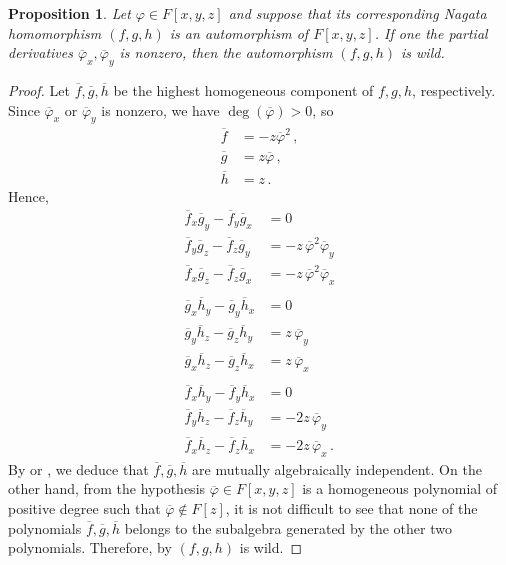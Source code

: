 \documentclass{amsart}
\newtheorem{prop}{Proposition}
\begin{document}
\begin{prop}\label{autwild}
	Let $\varphi\in F[x,y,z]$ and suppose that its corresponding Nagata homomorphism $(f,g,h)$ is an automorphism of $F[x,y,z]$. If one the partial derivatives  $\overline{\varphi}_x, \overline{\varphi}_y$ is nonzero, then the automorphism $(f,g,h)$ is wild.   
\end{prop}
\begin{proof}
	Let $\overline{f}, \overline{g}, \overline{h}$ be the highest homogeneous component of $f,g,h$, respectively.  Since $\overline{\varphi}_x$ or $ \overline{\varphi}_y$ is nonzero, we have $\deg(\overline{\varphi})>0$, so
	\begin{equation*}
		\begin{split}
			\overline{f}&=-z\overline{\varphi}^2\,,\\
			\overline{g}&=z\overline{\varphi}\,,\\
			\overline{h}&=z\,.     
		\end{split}
	\end{equation*}
	Hence,
	\begin{align*}
		\overline{f}_x\overline{g}_y-  \overline{f}_y\overline{g}_x&=0\\
		\overline{f}_y\overline{g}_z-  \overline{f}_z\overline{g}_y&=-z\,\overline{\varphi}^ 2\overline{\varphi}_y\\
		\overline{f}_x\overline{g}_z-  \overline{f}_z\overline{g}_x&=-z\,\overline{\varphi}^ 2\overline{\varphi}_x\\
		&\\
		\overline{g}_x\overline{h}_y-  \overline{g}_y\overline{h}_x&=0\\
		\overline{g}_y\overline{h}_z-  \overline{g}_z\overline{h}_y&=z\,\overline{\varphi}_y\\
		\overline{g}_x\overline{h}_z-  \overline{g}_z\overline{h}_x&=z\,\overline{\varphi}_x\\
		&\\
		\overline{f}_x\overline{h}_y-  \overline{f}_y\overline{h}_x&=0\\
		\overline{f}_y\overline{h}_z-  \overline{f}_z\overline{h}_y&=-2z\,\overline{\varphi}_y\\
		\overline{f}_x\overline{h}_z-  \overline{f}_z\overline{h}_x&=-2z\,\overline{\varphi}_x\,.
	\end{align*}
	By \cite[Corollary 2]{SU05} or \cite[Lemma 1]{SU04}, we deduce that $\overline{f}, \overline{g}, \overline{h}$ are mutually algebraically independent. On the other hand, from the hypothesis $\overline{\varphi}\in F[x,y,z]$ is a homogeneous polynomial of positive degree such that $\overline{\varphi}\not\in F[z]$, it is not difficult to see that none of the polynomials   $\overline{f}, \overline{g}, \overline{h}$ belongs to the subalgebra generated by the other two polynomials. Therefore, by \cite[Corollary 8]{SU04} $(f,g,h)$ is wild. 
\end{proof}
\end{document}
